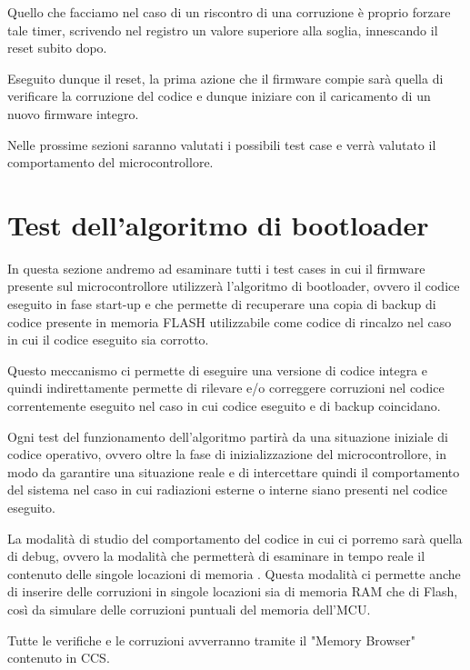 \documentclass[LaM,binding=0.6cm,oneside]{../sapthesis}
\begin{document}
Quello che facciamo nel caso di un riscontro di una corruzione è proprio forzare tale timer, scrivendo nel registro un valore superiore alla soglia, innescando il reset subito dopo.

Eseguito dunque il reset, la prima azione che il firmware compie sarà quella di verificare la corruzione del codice e dunque iniziare con il caricamento di un nuovo firmware integro.

Nelle prossime sezioni saranno valutati i possibili test case e verrà valutato il comportamento del microcontrollore.

\newpage
\section{Test dell'algoritmo di bootloader}
In questa sezione andremo ad esaminare tutti i test cases in cui il firmware presente sul microcontrollore utilizzerà l'algoritmo di bootloader, ovvero il codice eseguito in fase start-up e che permette di recuperare una copia di backup di codice presente in memoria FLASH utilizzabile come codice di rincalzo nel caso in cui il codice eseguito sia corrotto.

Questo meccanismo ci permette di eseguire una versione di codice integra e quindi indirettamente permette di rilevare e/o correggere corruzioni nel codice correntemente eseguito nel caso in cui codice eseguito e di backup coincidano.

Ogni test del funzionamento dell'algoritmo partirà da una situazione iniziale di codice operativo, ovvero oltre la fase di inizializzazione del microcontrollore, in modo da garantire una situazione reale e di intercettare quindi il comportamento del sistema nel caso in cui radiazioni esterne o interne siano presenti nel codice eseguito.

La modalità di studio del comportamento del codice in cui ci porremo sarà quella di debug, ovvero la modalità che permetterà di esaminare in tempo reale il contenuto delle singole locazioni di memoria .
Questa modalità ci permette anche di inserire delle corruzioni in singole locazioni sia di memoria RAM che di Flash, così da simulare delle corruzioni puntuali del memoria dell'MCU.

Tutte le verifiche e le corruzioni avverranno tramite il "Memory Browser" contenuto in CCS.
\end{document}
